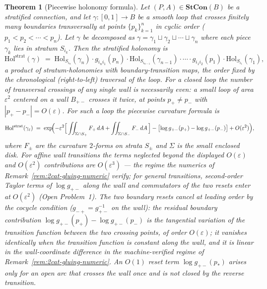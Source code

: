 \documentclass[11pt,a4paper]{article}
\theoremstyle{plain}
\newtheorem{theorem}{Theorem}[section]
\theoremstyle{definition}
\theoremstyle{remark}
\begin{document}
\begin{theorem}[Piecewise holonomy formula]
\label{thm:stratified-holonomy}
Let $(P, A) \in \mathbf{StCon}(B)$ be a stratified connection, and let
$\gamma : [0, 1] \to B$ be a smooth loop that crosses finitely many
boundaries transversally at points $\{p_k\}_{k=1}^n$ in cyclic order
($p_1 < p_2 < \cdots < p_n$). Let $\gamma$ be decomposed as
$\gamma = \gamma_1 \sqcup \gamma_2 \sqcup \cdots \sqcup \gamma_n$
where each piece $\gamma_k$ lies in stratum $S_{i_k}$. Then the
stratified holonomy is
\begin{equation}\label{eq:strat-holonomy}
  \mathrm{Hol}^{\mathrm{strat}}(\gamma) \;=\;
  \mathrm{Hol}_{S_{i_n}}(\gamma_n) \cdot g_{i_n i_1}(p_n) \cdot
  \mathrm{Hol}_{S_{i_{n-1}}}(\gamma_{n-1}) \cdot \cdots \cdot
  g_{i_1 i_2}(p_1) \cdot \mathrm{Hol}_{S_{i_1}}(\gamma_1),
\end{equation}
a product of stratum-holonomies with boundary-transition maps, the
order fixed by the chronological (right-to-left) traversal of the
loop. For a \emph{closed} loop the number of transversal crossings of
any single wall is necessarily even: a small loop of area
$\varepsilon^2$ centered on a wall $B_{+-}$ crosses it twice, at
points $p_+ \neq p_-$ with $|p_+ - p_-| = O(\varepsilon)$. For such a
loop the piecewise curvature formula is
\begin{equation}\label{eq:piecewise-F}
  \mathrm{Hol}^{\mathrm{strat}}(\gamma_\varepsilon) \;=\;
  \exp\!\Bigl(-\varepsilon^2\Bigl[\,\iint_{\Sigma \cap S_+} F_+\,
  dA + \iint_{\Sigma \cap S_-} F_-\, dA\,\Bigr]
  - \bigl[\log g_{+-}(p_+) - \log g_{+-}(p_-)\bigr]
  + O(\varepsilon^2)\Bigr),
\end{equation}
where $F_\pm$ are the curvature $2$-forms on strata $S_\pm$ and
$\Sigma$ is the small enclosed disk. For affine wall transitions
the terms neglected beyond the displayed
$O(\varepsilon)$ and $O(\varepsilon^2)$ contributions are
$O(\varepsilon^3)$ --- the regime the numerics of
Remark~\ref{rem:2cat-gluing-numeric} verify; for general
transitions, second-order Taylor terms of $\log g_{+-}$ along the
wall and commutators of the two resets enter at $O(\varepsilon^2)$
(Open Problem~1). The two boundary resets cancel
at leading order by the cocycle condition
($g_{-+} = g_{+-}^{-1}$ on the wall): the residual boundary
contribution $\log g_{+-}(p_+) - \log g_{+-}(p_-)$ is the
\emph{tangential variation} of the transition function between the
two crossing points, of order $O(\varepsilon)$; it vanishes identically
when the transition function is constant along the wall, and it is
linear in the wall-coordinate difference in the machine-verified
regime of Remark~\ref{rem:2cat-gluing-numeric}. An $O(1)$ reset term
$\log g_{+-}(p_*)$ arises only for an \emph{open arc} that crosses
the wall once and is not closed by the reverse transition.
\end{theorem}
\end{document}
